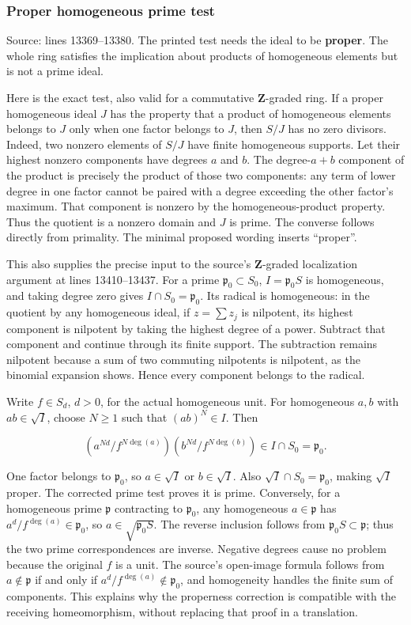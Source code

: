 \subsubsection{Proper homogeneous prime test}\label{algebra-proof-002-proper-homogeneous-prime-test}

Source: lines 13369--13380. The printed test needs the ideal to be \textbf{proper}. The whole ring satisfies the implication about products of homogeneous elements but is not a prime ideal.

Here is the exact test, also valid for a commutative \(\mathbf Z\)-graded ring. If a proper homogeneous ideal \(J\) has the property that a product of homogeneous elements belongs to \(J\) only when one factor belongs to \(J\), then \(S/J\) has no zero divisors. Indeed, two nonzero elements of \(S/J\) have finite homogeneous supports. Let their highest nonzero components have degrees \(a\) and \(b\). The degree-\(a+b\) component of the product is precisely the product of those two components: any term of lower degree in one factor cannot be paired with a degree exceeding the other factor's maximum. That component is nonzero by the homogeneous-product property. Thus the quotient is a nonzero domain and \(J\) is prime. The converse follows directly from primality. The minimal proposed wording inserts ``proper''.

This also supplies the precise input to the source's \(\mathbf Z\)-graded localization argument at lines 13410--13437. For a prime \(\mathfrak p_0\subset S_0\), \(I=\mathfrak p_0S\) is homogeneous, and taking degree zero gives \(I\cap S_0=\mathfrak p_0\). Its radical is homogeneous: in the quotient by any homogeneous ideal, if \(z=\sum z_j\) is nilpotent, its highest component is nilpotent by taking the highest degree of a power. Subtract that component and continue through its finite support. The subtraction remains nilpotent because a sum of two commuting nilpotents is nilpotent, as the binomial expansion shows. Hence every component belongs to the radical.

Write \(f\in S_d\), \(d>0\), for the actual homogeneous unit. For homogeneous \(a,b\) with \(ab\in\sqrt I\), choose \(N\geq1\) such that \((ab)^N\in I\). Then

\[
\left(a^{Nd}/f^{N\deg(a)}\right)
\left(b^{Nd}/f^{N\deg(b)}\right)\in I\cap S_0=\mathfrak p_0.
\]

One factor belongs to \(\mathfrak p_0\), so \(a\in\sqrt I\) or \(b\in\sqrt I\). Also \(\sqrt I\cap S_0=\mathfrak p_0\), making \(\sqrt I\) proper. The corrected prime test proves it is prime. Conversely, for a homogeneous prime \(\mathfrak p\) contracting to \(\mathfrak p_0\), any homogeneous \(a\in\mathfrak p\) has \(a^d/f^{\deg(a)}\in\mathfrak p_0\), so \(a\in\sqrt{\mathfrak p_0S}\). The reverse inclusion follows from \(\mathfrak p_0S\subset\mathfrak p\); thus the two prime correspondences are inverse. Negative degrees cause no problem because the original \(f\) is a unit. The source's open-image formula follows from \(a\notin\mathfrak p\) if and only if \(a^d/f^{\deg(a)}\notin\mathfrak p_0\), and homogeneity handles the finite sum of components. This explains why the properness correction is compatible with the receiving homeomorphism, without replacing that proof in a translation.

